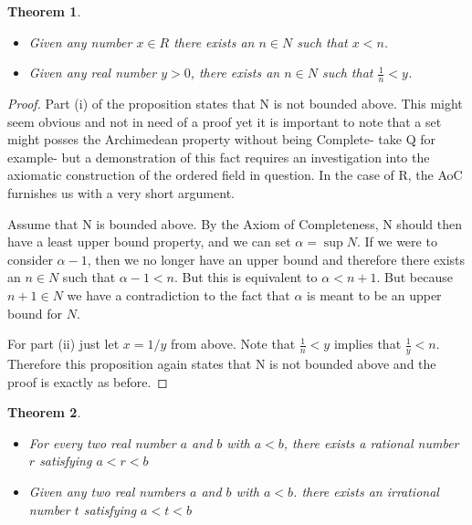 \documentclass{tufte-book}
\newtheorem{theorem}{Theorem}[chapter]
\theoremstyle{definition}
\numberwithin{section}{chapter}
\begin{document}
\begin{theorem}  \begin{itemize}[(i)] 
\item  Given any number $x \in R$ there exists an $n \in N$ such that $x<n$.  \item Given any real number $y>0$, there exists an $ n \in N$ such that $\frac{1}{n}< y$. \end{itemize} \end{theorem}

\begin{proof}   Part (i) of the proposition states that N is not bounded above.  This might seem obvious and not in need of a proof yet it is important to note that a set might posses the Archimedean property without being Complete- take Q for example- but a demonstration of this fact requires an investigation into the axiomatic construction of the ordered field in question. In the case of R, the AoC furnishes us with a very short argument.

Assume that N is bounded above.  By the Axiom of Completeness, N should then have a least upper bound property, and we can set $\alpha = \sup N$.  If we were to consider $\alpha -1$, then we no longer have an upper bound and therefore there exists an $n \in N$ such that $\alpha - 1 < n$.  But this is equivalent to $\alpha < n+1$. But because $n+1 \in N$ we have a contradiction to the fact that $\alpha $ is meant to be  an upper bound for $N$.  

For part (ii) just let $x = 1/y$ from above.
Note that $\frac{1}{n} < y$ implies that $\frac{1}{y} < n$.  Therefore this proposition again states that N is not bounded above and the proof is exactly as before.
\end{proof}

\begin{theorem}    

\begin{itemize}[(i)] 
\item    For every two real number $a$ and $b$ with $a<b$, there exists a rational number $r$ satisfying $a<r<b$
\item Given any two real numbers $a$ and $b$ with $a<b$. there exists an irrational number $t$ satisfying $a<t<b$
 \end{itemize} \end{theorem}
 
\end{document}
